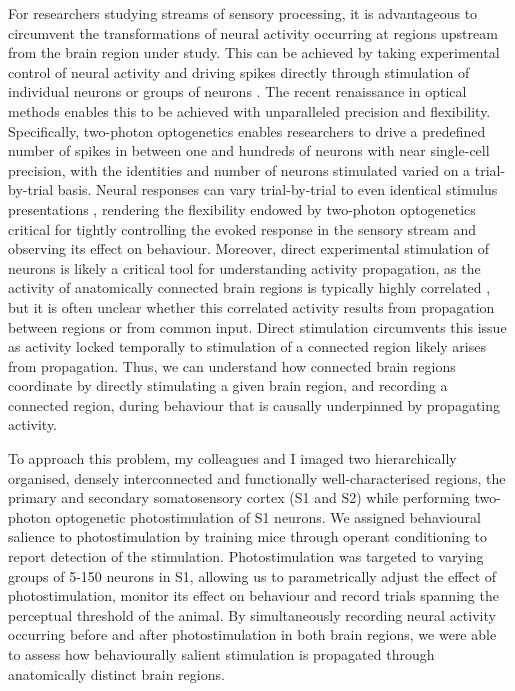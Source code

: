 For researchers studying streams of sensory processing, it is advantageous to circumvent the transformations of neural activity occurring at regions upstream from the brain region under study. This can be achieved by taking experimental control of neural activity and driving spikes directly through stimulation of individual neurons \cite{houweling_behavioural_2008, tanke_single-cell_2018, chettih_single-neuron_2019} or groups of neurons \cite{romo_somatosensory_1998, huber_sparse_2008, histed_cortical_2014, dalgleish_how_2020, gill_precise_2020}. The recent renaissance in optical methods enables this to be achieved with unparalleled precision and flexibility. Specifically, two-photon optogenetics enables researchers to drive a predefined number of spikes in between one and hundreds of neurons with near single-cell precision, with the identities and number of neurons stimulated varied on a trial-by-trial basis. Neural responses can vary trial-by-trial to even identical stimulus presentations \cite{britten_responses_1993, faisal_noise_2008, softky_highly_1993}, rendering the flexibility endowed by two-photon optogenetics critical for tightly controlling the evoked response in the sensory stream and observing its effect on behaviour. Moreover, direct experimental stimulation of neurons is likely a critical tool for understanding activity propagation, as the activity of anatomically connected brain regions is typically highly correlated \cite{honey_predicting_2009, musall_single-trial_2019}, but it is often unclear whether this correlated activity results from propagation between regions or from common input. Direct stimulation circumvents this issue as activity locked temporally to stimulation of a connected region likely arises from propagation. Thus, we can understand how connected brain regions coordinate by directly stimulating a given brain region, and recording a connected region, during behaviour that is causally underpinned by propagating activity.

To approach this problem, my colleagues and I imaged two hierarchically organised, densely interconnected and functionally well-characterised \cite{pons_physiological_1987, kamatani_experience-dependent_2007, aronoff_long-range_2010, chen_behaviour-dependent_2013, yamashita_membrane_2013, chen_long-range_2016, kwon_sensory_2016, yamashita_target-specific_2016} regions, the primary and secondary somatosensory cortex (S1 and S2) while performing two-photon optogenetic photostimulation of S1 neurons. We assigned behavioural salience to photostimulation by training mice through operant conditioning to report detection of the stimulation. Photostimulation was targeted to varying groups of 5-150 neurons in S1, allowing us to parametrically adjust the effect of photostimulation, monitor its effect on behaviour and record trials spanning the perceptual threshold of the animal. By simultaneously recording neural activity occurring before and after photostimulation in both brain regions, we were able to assess how behaviourally salient stimulation is propagated through anatomically distinct brain regions.

